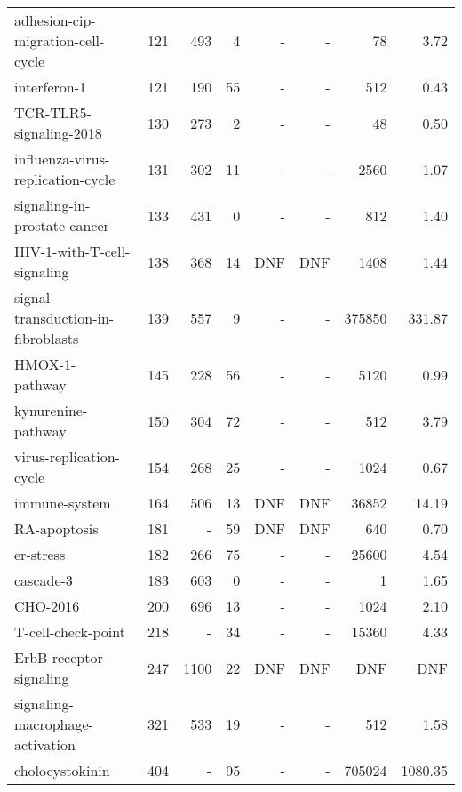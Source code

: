 \documentclass[runningheads]{llncs}
\begin{document}
\begin{table}[!htb]
\begin{tabular}{lrrrrrrr}
    adhesion-cip-migration-cell-cycle~\cite{guberman2020boolean} & 121 & 493 & 4 & - & - & 78 & 3.72 \\
    interferon-1~\cite{ostaszewski2021covid19} & 121 & 190 & 55 & - & - & 512 & 0.43 \\
    TCR-TLR5-signaling-2018~\cite{rodriguez2019cooperation} & 130 & 273 & 2 & - & - & 48 & 0.50 \\
    influenza-virus-replication-cycle~\cite{DBLP:journals/bmcsb/HelikarKMBRMWSLR12} & 131 & 302 & 11 & - & - & 2560 & 1.07 \\
    signaling-in-prostate-cancer~\cite{Montagud2021} & 133 & 431 & 0 & - & - & 812 & 1.40 \\
    HIV-1-with-T-cell-signaling~\cite{DBLP:journals/bmcsb/HelikarKMBRMWSLR12} & 138 & 368 & 14 & DNF & DNF & 1408 & 1.44 \\
    signal-transduction-in-fibroblasts~\cite{helikar2008emergent} & 139 & 557 & 9 & - & - & 375850 & 331.87 \\
    HMOX-1-pathway~\cite{ostaszewski2021covid19} & 145 & 228 & 56 & - & - & 5120 & 0.99 \\
    kynurenine-pathway~\cite{ostaszewski2021covid19} & 150 & 304 & 72 & - & - & 512 & 3.79 \\
    virus-replication-cycle~\cite{ostaszewski2021covid19} & 154 & 268 & 25 & - & - & 1024 & 0.67 \\
    immune-system~\cite{DBLP:journals/bmcsb/HelikarKMBRMWSLR12} & 164 & 506 & 13 & DNF & DNF & 36852 & 14.19 \\
    RA-apoptosis~\cite{aghamiri2020automated} & 181 & - & 59 & DNF & DNF & 640 & 0.70 \\
    er-stress~\cite{ostaszewski2021covid19} & 182 & 266 & 75 & - & - & 25600 & 4.54 \\
    cascade-3~\cite{Tsirvouli2020} & 183 & 603 & 0 & - & - & 1 & 1.65 \\
    CHO-2016~\cite{lee2019signal} & 200 & 696 & 13 & - & - & 1024 & 2.10 \\ \midrule
    
    T-cell-check-point~\cite{hernandez2020computational} & 218 & - & 34 & - & - & 15360 & 4.33 \\
    ErbB-receptor-signaling~\cite{helikar2013comprehensive} & 247 & 1100 & 22 & DNF & DNF & DNF & DNF \\
    signaling-macrophage-activation~\cite{DBLP:journals/bmcsb/HelikarKMBRMWSLR12} & 321 & 533 & 19 & - & - & 512 & 1.58 \\
    cholocystokinin~\cite{aghamiri2020automated} & 404 & - & 95 & - & - & 705024 & 1080.35 \\ \midrule
    

\end{tabular}
\end{table}
\end{document}
